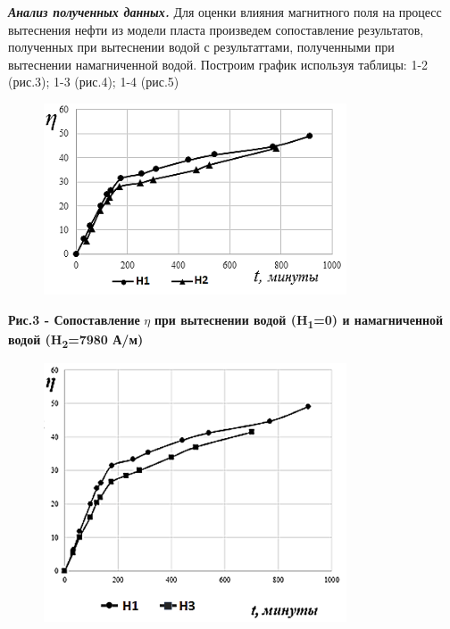 
\emph{{\bfseries Анализ полученных данных.}} Для оценки влияния магнитного
поля на процесс вытеснения нефти из модели пласта произведем
сопоставление результатов, полученных при вытеснении водой с
результаттами, полученными при вытеснении намагниченной водой. Построим
график используя таблицы: 1-2 (рис.3); 1-3 (рис.4); 1-4 (рис.5)

\begin{figure}[H]
	\centering
	\includegraphics[width=0.8\textwidth]{media/gorn4/image4}
	\caption*{}
\end{figure}


{\bfseries Рис.3 - Сопоставление} \(\eta\) {\bfseries при вытеснении водой
(H\textsubscript{1}=0) и намагниченной водой (H\textsubscript{2}=7980
А/м)}

\begin{figure}[H]
	\centering
	\includegraphics[width=0.8\textwidth]{media/gorn4/image5}
	\caption*{}
\end{figure}


